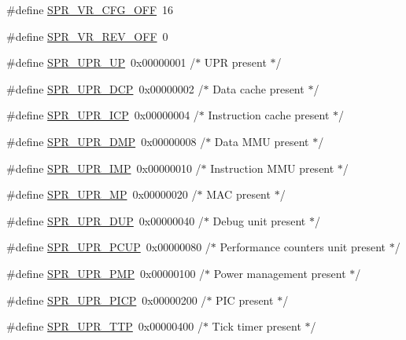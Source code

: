 \begin{DoxyCompactItemize}
\item 
\#define \hyperlink{spr-defs_8h_ae4d249a9fe610aa1b098874f11a8187b}{\-S\-P\-R\-\_\-\-V\-R\-\_\-\-C\-F\-G\-\_\-\-O\-F\-F}~16
\item 
\#define \hyperlink{spr-defs_8h_ae08e96c8d62ca160fa378b35e5d64f6d}{\-S\-P\-R\-\_\-\-V\-R\-\_\-\-R\-E\-V\-\_\-\-O\-F\-F}~0
\item 
\#define \hyperlink{spr-defs_8h_a29a503d6c90ce28f2f924f95f0d67d38}{\-S\-P\-R\-\_\-\-U\-P\-R\-\_\-\-U\-P}~0x00000001  /$\ast$ U\-P\-R present $\ast$/
\item 
\#define \hyperlink{spr-defs_8h_aa37fb9846c4922a393e86efbdf578546}{\-S\-P\-R\-\_\-\-U\-P\-R\-\_\-\-D\-C\-P}~0x00000002  /$\ast$ Data cache present $\ast$/
\item 
\#define \hyperlink{spr-defs_8h_accfc87b8e38b65e09f29c96fe112b72c}{\-S\-P\-R\-\_\-\-U\-P\-R\-\_\-\-I\-C\-P}~0x00000004  /$\ast$ Instruction cache present $\ast$/
\item 
\#define \hyperlink{spr-defs_8h_ad22f40f6b78f7dbabaa9fd0be1513ea7}{\-S\-P\-R\-\_\-\-U\-P\-R\-\_\-\-D\-M\-P}~0x00000008  /$\ast$ Data M\-M\-U present $\ast$/
\item 
\#define \hyperlink{spr-defs_8h_ace8a8f949e50da852cd8f8ea632a1964}{\-S\-P\-R\-\_\-\-U\-P\-R\-\_\-\-I\-M\-P}~0x00000010  /$\ast$ Instruction M\-M\-U present $\ast$/
\item 
\#define \hyperlink{spr-defs_8h_a69d6a1144fcf649a10180b8f4768d75c}{\-S\-P\-R\-\_\-\-U\-P\-R\-\_\-\-M\-P}~0x00000020  /$\ast$ M\-A\-C present $\ast$/
\item 
\#define \hyperlink{spr-defs_8h_a4843ed545e07cd231ad415c9240ed662}{\-S\-P\-R\-\_\-\-U\-P\-R\-\_\-\-D\-U\-P}~0x00000040  /$\ast$ Debug unit present $\ast$/
\item 
\#define \hyperlink{spr-defs_8h_ac8f84588519a5712430973bf0ca1965f}{\-S\-P\-R\-\_\-\-U\-P\-R\-\_\-\-P\-C\-U\-P}~0x00000080  /$\ast$ Performance counters unit present $\ast$/
\item 
\#define \hyperlink{spr-defs_8h_a2ec9afb6c484c6bb033239aadb1c6a1a}{\-S\-P\-R\-\_\-\-U\-P\-R\-\_\-\-P\-M\-P}~0x00000100  /$\ast$ Power management present $\ast$/
\item 
\#define \hyperlink{spr-defs_8h_a0e75bc1b124873a1adb26dfc09e89eed}{\-S\-P\-R\-\_\-\-U\-P\-R\-\_\-\-P\-I\-C\-P}~0x00000200  /$\ast$ P\-I\-C present $\ast$/
\item 
\#define \hyperlink{spr-defs_8h_aedc2d673a8cb50b2b5b640c776eaf31b}{\-S\-P\-R\-\_\-\-U\-P\-R\-\_\-\-T\-T\-P}~0x00000400  /$\ast$ Tick timer present $\ast$/
\item 

\end{DoxyCompactItemize}
